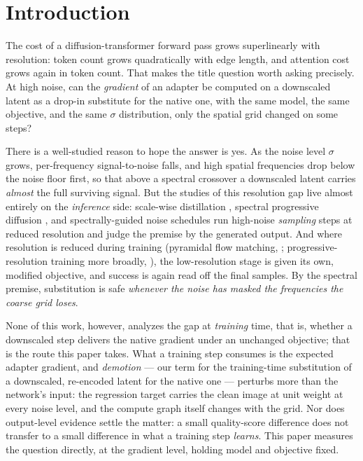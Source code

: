\section{Introduction}
\label{sec:intro}

The cost of a diffusion-transformer forward pass grows superlinearly with
resolution: token count grows quadratically with edge length, and
attention cost grows again in token count. That makes the title question
worth asking precisely. At high noise, can the \emph{gradient} of an
adapter be computed on a downscaled latent as a drop-in substitute for
the native one, with the same model, the same objective, and the same
$\sigma$ distribution, only the spatial grid changed on some steps?

There is a well-studied reason to hope the answer is yes. As the noise
level $\sigma$ grows, per-frequency signal-to-noise falls, and high
spatial frequencies drop below the noise floor first, so that above a
spectral crossover a downscaled latent carries \emph{almost} the full
surviving signal. But the studies of this resolution gap live almost
entirely on the \emph{inference} side: scale-wise distillation
\citep{starodubcev2025swd}, spectral progressive diffusion
\citep{xiao2026spd}, and spectrally-guided noise schedules
\citep{esteves2026spectral} run high-noise \emph{sampling} steps at
reduced resolution and judge the premise by the generated output. And
where resolution is reduced during training (pyramidal flow
matching, \citealp{jin2024pyramidal}; progressive-resolution training
more broadly,
\citealp{karras2018progressive,chen2024pixartalpha,hoogeboom2023simple}),
the low-resolution stage is given its own, modified objective, and
success is again read off the final samples. By the spectral premise,
substitution is safe \emph{whenever the noise has masked the
frequencies the coarse grid loses}.

None of this work, however, analyzes the gap at \emph{training} time,
that is, whether a downscaled step delivers the native gradient under
an unchanged objective; that is the route this paper takes. What a training step consumes is the expected adapter gradient,
and \emph{demotion} --- our term for the training-time substitution of
a downscaled, re-encoded latent for the native one --- perturbs more
than the network's input: the regression
target carries the clean image at unit weight at every noise level,
and the compute graph itself changes with the grid. Nor does
output-level evidence settle the matter: a small quality-score
difference does not transfer to a small difference in what a training
step \emph{learns}. This paper measures the question directly, at the
gradient level, holding model and objective fixed.

